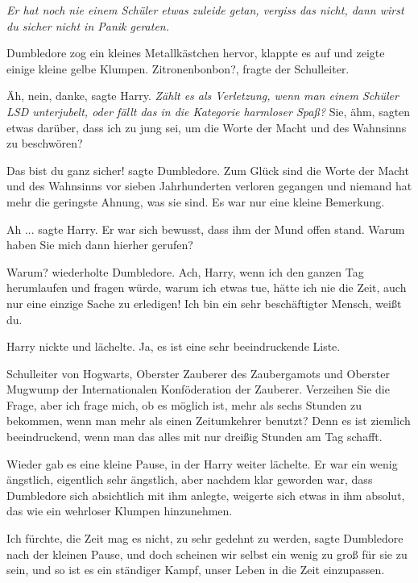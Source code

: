 \emph{Er hat noch nie einem Schüler etwas zuleide getan, vergiss das nicht, dann
wirst du sicher nicht in Panik geraten.}

Dumbledore zog ein kleines Metallkästchen hervor, klappte es auf und zeigte
einige kleine gelbe Klumpen. \glqq{}Zitronenbonbon?\grqq{}, fragte der
Schulleiter.

\glqq{}Äh, nein, danke\grqq{}, sagte Harry. \emph{Zählt es als Verletzung, wenn
man einem Schüler LSD unterjubelt, oder fällt das in die Kategorie harmloser
Spaß?} \glqq{}Sie, ähm, sagten etwas darüber, dass ich zu jung sei, um die Worte
der Macht und des Wahnsinns zu beschwören?\grqq{}

\glqq{}Das bist du ganz sicher!\grqq{} sagte Dumbledore. \glqq{}Zum Glück sind die
Worte der Macht und des Wahnsinns vor sieben Jahrhunderten verloren gegangen und
niemand hat mehr die geringste Ahnung, was sie sind. Es war nur eine kleine
Bemerkung.\grqq{}

\glqq{}Ah ...\grqq{} sagte Harry. Er war sich bewusst, dass ihm der Mund offen
stand. \glqq{}Warum haben Sie mich dann hierher gerufen?\grqq{}

\glqq{}Warum?\grqq{} wiederholte Dumbledore. \glqq{}Ach, Harry, wenn ich den
ganzen Tag herumlaufen und fragen würde, warum ich etwas tue, hätte ich nie die
Zeit, auch nur eine einzige Sache zu erledigen! Ich bin ein sehr beschäftigter
Mensch, weißt du.\grqq{}

Harry nickte und lächelte. \glqq{}Ja, es ist eine sehr beeindruckende Liste.

Schulleiter von Hogwarts, Oberster Zauberer des Zaubergamots und Oberster
Mugwump der Internationalen Konföderation der Zauberer. Verzeihen Sie die Frage,
aber ich frage mich, ob es möglich ist, mehr als sechs Stunden zu bekommen, wenn
man mehr als einen Zeitumkehrer benutzt? Denn es ist ziemlich beeindruckend,
wenn man das alles mit nur dreißig Stunden am Tag schafft.\grqq{}

Wieder gab es eine kleine Pause, in der Harry weiter lächelte. Er war ein wenig
ängstlich, eigentlich sehr ängstlich, aber nachdem klar geworden war, dass
Dumbledore sich absichtlich mit ihm anlegte, weigerte sich etwas in ihm absolut,
das wie ein wehrloser Klumpen hinzunehmen.

\glqq{}Ich fürchte, die Zeit mag es nicht, zu sehr gedehnt zu werden\grqq{},
sagte Dumbledore nach der kleinen Pause, \glqq{}und doch scheinen wir selbst ein
wenig zu groß für sie zu sein, und so ist es ein ständiger Kampf, unser Leben in
die Zeit einzupassen.\grqq{}

